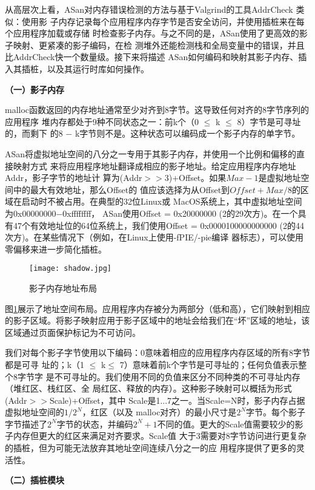 从高层次上看，ASan对内存错误检测的方法与基于Valgrind的工具AddrCheck 类似：使用影
子内存记录每个应用程序内存字节是否安全访问，并使用插桩来在每个应用程序加载或存储
时检查影子内存。与之不同的是，ASan使用了更高效的影子映射、更紧凑的影子编码，在检
测堆外还能检测栈和全局变量中的错误，并且比AddrCheck快一个数量级。接下来将描述
ASan如何编码和映射其影子内存、插入其插桩，以及其运行时库如何操作。

\textbf{（一）影子内存}

malloc函数返回的内存地址通常至少对齐到8字节。这导致任何对齐的8字节序列的应用程序
堆内存都处于9种不同状态之一：前k个（0 $\leq$ k $\leq$ 8）字节是可寻址的，而剩下
的8 $-$ k字节则不是。这种状态可以编码成一个影子内存的单字节。

ASan将虚拟地址空间的八分之一专用于其影子内存，并使用一个比例和偏移的直接映射方式
来将应用程序地址翻译成相应的影子地址。给定应用程序内存地址Addr，影子字节的地址计
算为(Addr$>>$3)+Offset。如果$Max-1$是虚拟地址空间中的最大有效地址，那么Offset的
值应该选择为从Offset到$Offset+Max/8$的区域在启动时不被占用。在典型的32位Linux或
MacOS系统上，其中虚拟地址空间为0x00000000$-$0xffffffff， ASan使用Offset =
0x20000000 (2的29次方)。在一个具有47个有效地址位的64位系统上，我们使用Offset =
0x0000100000000000 (2的44次方)。在某些情况下（例如，在Linux上使用-fPIE/-pie编译
器标志），可以使用零偏移来进一步简化插桩。
\begin{figure}[ht]
	\centering
	\texttt{[image: shadow.jpg]}
	\caption{影子内存地址布局}
	\label{fig:shadow}
\end{figure}

图\ref{fig:shadow}展示了地址空间布局。应用程序内存被分为两部分（低和高），它们映射到相应的影子区域。将影子映射应用于影子区域中的地址会给我们在“坏”区域的地址，该区域通过页面保护标记为不可访问。

我们对每个影子字节使用以下编码：0意味着相应的应用程序内存区域的所有8字节都是可寻
址的；k（1 $\leq$ k$\leq$ 7）意味着前k个字节是可寻址的；任何负值表示整个8字节字
是不可寻址的。我们使用不同的负值来区分不同种类的不可寻址内存（堆红区、栈红区、全
局红区、释放的内存）。这种影子映射可以概括为形式(Addr$>>$Scale)+Offset，其中
Scale是1...7之一。当Scale=N时，影子内存占据虚拟地址空间的$1/2^N$，红区（以及
malloc对齐）的最小尺寸是$2^N$字节。每个影子字节描述了$2^N$字节的状态，并编码$2^N
+1$不同的值。更大的Scale值需要较少的影子内存但更大的红区来满足对齐要求。Scale值
大于3需要对8字节访问进行更复杂的插桩，但为可能无法放弃其地址空间连续八分之一的应
用程序提供了更多的灵活性。

\textbf{（二）插桩模块}

